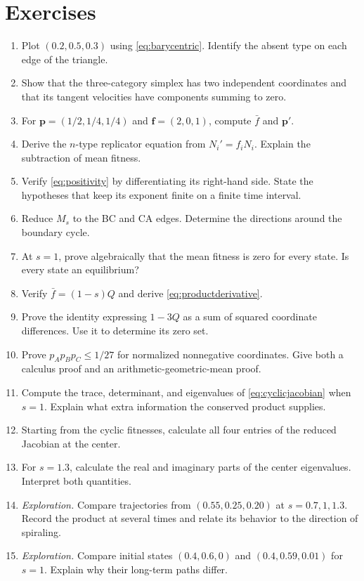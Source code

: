 \documentclass[11pt,oneside,openany]{book}
\theoremstyle{definition}
\theoremstyle{remark}
\newenvironment{exercises}{\begin{enumerate}[label=\thechapter.\arabic*,ref=\thechapter.\arabic*,leftmargin=2.8em,itemsep=6pt]}{\end{enumerate}}
\newcommand{\p}{\mathbf{p}}
\newcommand{\f}{\mathbf{f}}
\numberwithin{equation}{chapter}
\begin{document}
\FloatBarrier
\section{Exercises}
\begin{exercises}
\item Plot $(0.2,0.5,0.3)$ using \eqref{eq:barycentric}. Identify the absent type on each edge of the triangle.
\item Show that the three-category simplex has two independent coordinates and that its tangent velocities have components summing to zero.
\item For $\p=(1/2,1/4,1/4)$ and $\f=(2,0,1)$, compute $\bar f$ and $\p'$.
\item Derive the $n$-type replicator equation from $N_i'=f_iN_i$. Explain the subtraction of mean fitness.
\item Verify \eqref{eq:positivity} by differentiating its right-hand side. State the hypotheses that keep its exponent finite on a finite time interval.
\item Reduce $M_s$ to the BC and CA edges. Determine the directions around the boundary cycle.
\item At $s=1$, prove algebraically that the mean fitness is zero for every state. Is every state an equilibrium?
\item Verify $\bar f=(1-s)Q$ and derive \eqref{eq:productderivative}.
\item Prove the identity expressing $1-3Q$ as a sum of squared coordinate differences. Use it to determine its zero set.
\item Prove $p_Ap_Bp_C\leq1/27$ for normalized nonnegative coordinates. Give both a calculus proof and an arithmetic-geometric-mean proof.
\item Compute the trace, determinant, and eigenvalues of \eqref{eq:cyclicjacobian} when $s=1$. Explain what extra information the conserved product supplies.
\item Starting from the cyclic fitnesses, calculate all four entries of the reduced Jacobian at the center.
\item For $s=1.3$, calculate the real and imaginary parts of the center eigenvalues. Interpret both quantities.
\item \emph{Exploration.} Compare trajectories from $(0.55,0.25,0.20)$ at $s=0.7,1,1.3$. Record the product at several times and relate its behavior to the direction of spiraling.
\item \emph{Exploration.} Compare initial states $(0.4,0.6,0)$ and $(0.4,0.59,0.01)$ for $s=1$. Explain why their long-term paths differ.

\end{exercises}
\end{document}
